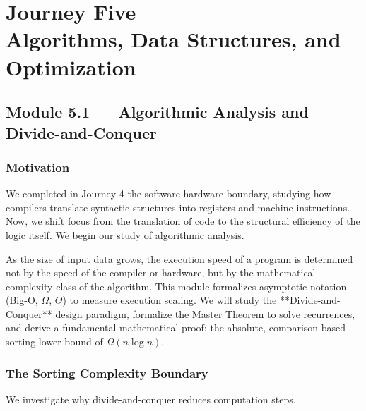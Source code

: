 \documentclass[12pt, a4paper]{book}
\begin{document}
\setcounter{chapter}{4}
\chapter[Journey 5 --- Algorithms, Data Structures, and Optimization]
        {Journey Five\\[8pt]
         \textcolor{ModuleColor}{\large Algorithms, Data Structures, and Optimization}}
\setcounter{section}{0}

\section{Module 5.1 --- Algorithmic Analysis and Divide-and-Conquer}
\label{sec:mod5.1}

\subsection*{Motivation}

We completed in Journey 4 the software-hardware boundary, studying how compilers translate syntactic structures into registers and machine instructions.
Now, we shift focus from the translation of code to the structural efficiency of the logic itself.
We begin our study of algorithmic analysis.

As the size of input data grows, the execution speed of a program is determined not by the speed of the compiler or hardware, but by the mathematical complexity class of the algorithm.
This module formalizes asymptotic notation (Big-O, $\Omega$, $\Theta$) to measure execution scaling.
We will study the **Divide-and-Conquer** design paradigm, formalize the Master Theorem to solve recurrences, and derive a fundamental mathematical proof: the absolute, comparison-based sorting lower bound of $\Omega(n \log n)$.

\subsection{The Sorting Complexity Boundary}

We investigate why divide-and-conquer reduces computation steps.
\end{document}
